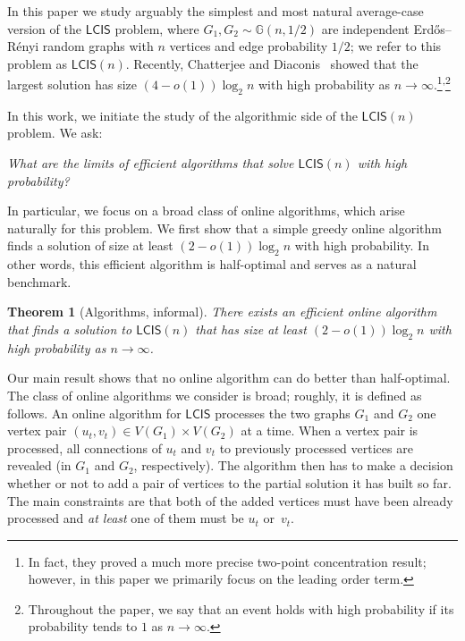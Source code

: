 \documentclass[11pt]{article}
\theoremstyle{plain}
\newtheorem{theorem}{Theorem}
\theoremstyle{definition}
\theoremstyle{remark}
\newcommand{\Gnhalf}{\mathbb{G}(n,1/2)}
\newcommand{\ER}{Erd\H{o}s--R\'{e}nyi }
\newcommand{\MCS}{\mathsf{LCIS}}
\begin{document}
In this paper we study arguably the simplest and most natural average-case version of the $\MCS$ problem, 
where 
$G_{1}, G_{2} \sim \Gnhalf$ 
are independent \ER random graphs with $n$ vertices and edge probability $1/2$; we refer to this problem as $\MCS(n)$. 
Recently, Chatterjee and Diaconis~\cite{CD23} showed that the largest solution has size $(4 - o(1))\log_2 n$ with high probability as $n \to \infty$.\footnote{In fact, they proved a much more precise two-point concentration result; however, in this paper we primarily focus on the leading order term.}\textsuperscript{,}\footnote{Throughout the paper, we say that an event holds with high probability if its probability tends to $1$ as $n \to \infty$.} 

In this work, we initiate the study of the algorithmic side of the $\MCS(n)$ problem. We ask: %

\begin{center}
    \emph{What are the limits of efficient algorithms that solve $\MCS(n)$ with high probability?}
\end{center}

In particular, we focus on a broad class of online algorithms, which arise naturally for this problem. 
We first show that a simple greedy online algorithm finds a solution of size at least $(2-o(1)) \log_2 n$ with high probability. In other words, this efficient algorithm is half-optimal and serves as a natural benchmark. 



\begin{theorem}[Algorithms, informal]
    There exists an efficient online algorithm that finds a solution to $\MCS(n)$ that 
    has size at least $(2 - o(1)) \log_2 n$ with high probability as $n \to \infty$.
\end{theorem}


Our main result shows that no online algorithm can do better than half-optimal. 
The class of online algorithms we consider is broad; roughly, it is defined as follows. 
An online algorithm for $\MCS$ processes the two graphs $G_{1}$ and $G_{2}$ one vertex pair $(u_{t}, v_{t}) \in V(G_{1}) \times V(G_{2})$ at a time. When a vertex pair is processed, all connections of $u_{t}$ and $v_{t}$ to previously processed vertices are revealed (in $G_{1}$ and $G_{2}$, respectively). The algorithm then has to make a decision whether or not to add a pair of vertices to the partial solution it has built so far. The main constraints are that both of the added vertices must have been already processed and \emph{at least} one of them must be $u_{t}$ or~$v_{t}$. 
\end{document}
